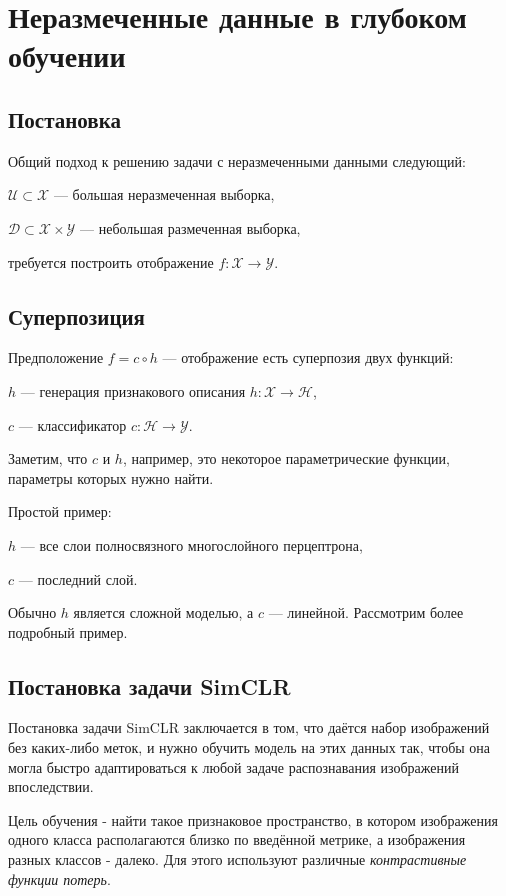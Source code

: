 \section{Неразмеченные данные в глубоком обучении}

\subsection{Постановка}
\hspace{2em}Общий подход к решению задачи с неразмеченными данными следующий:

$\mathcal{U} \subset \mathcal{X}$ --- большая неразмеченная выборка,

$\mathcal{D} \subset  \mathcal{X}\times \mathcal{Y}$ --- небольшая размеченная выборка,

требуется построить отображение $f: \mathcal{X} \to \mathcal{Y}$.

\subsection{Суперпозиция}
\hspace{2em}Предположение $f = c  \circ  h$ --- отображение есть суперпозия двух функций:

$h$ --- генерация признакового описания $h: \mathcal{X} \to \mathcal{H}$,

$c$ --- классификатор $c: \mathcal{H} \to \mathcal{Y}$.

Заметим, что $c$ и $h$, например, это некоторое параметрические функции, параметры которых нужно найти.

Простой пример:

$h$ --- все слои полносвязного многослойного перцептрона,

$c$ --- последний слой.

Обычно $h$ является сложной моделью, а $c$ --- линейной. Рассмотрим более подробный пример.

\subsection{Постановка задачи SimCLR}

\hspace{2em}Постановка задачи SimCLR заключается в том, что даётся набор изображений без каких-либо меток, и нужно обучить модель на этих данных так, чтобы она могла быстро адаптироваться к любой задаче распознавания изображений впоследствии.

Цель обучения - найти такое признаковое пространство, в котором изображения одного класса располагаются близко по введённой метрике, а изображения разных классов - далеко. Для этого используют различные \textit{контрастивные функции потерь}.

